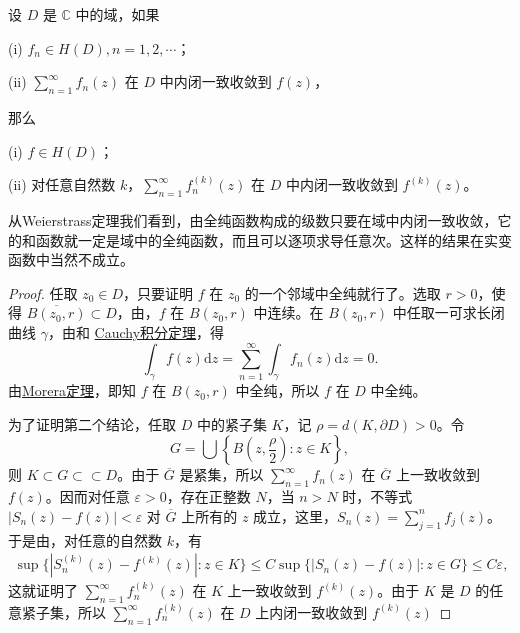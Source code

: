\documentclass[../../main.tex]{subfiles}
\begin{document}
\begin{theorem}[Weierstrass定理]\label{theorem:Weierstrass定理}
设 \( D \) 是 \( \mathbb{C} \) 中的域，如果

(i) \( f_n \in H(D), n = 1, 2, \cdots \)；

(ii) \( \sum_{n=1}^{\infty} f_n(z) \) 在 \( D \) 中内闭一致收敛到 \( f(z) \)，

那么

(i) \( f \in H(D) \)；

(ii) 对任意自然数 \( k \)，\( \sum_{n=1}^{\infty} f_n^{(k)}(z) \) 在 \( D \) 中内闭一致收敛到 \( f^{(k)}(z) \)。
\end{theorem}
\begin{note}
从Weierstrass定理我们看到，由全纯函数构成的级数只要在域中内闭一致收敛，它的和函数就一定是域中的全纯函数，而且可以逐项求导任意次。这样的结果在实变函数中当然不成立。
\end{note}
\begin{proof}
任取 \( z_0 \in D \)，只要证明 \( f \) 在 \( z_0 \) 的一个邻域中全纯就行了。选取 \( r > 0 \)，使得 \( \overline{B(z_0, r)} \subset D \)，由，\( f \) 在 \( B(z_0, r) \) 中连续。在 \( B(z_0, r) \) 中任取一可求长闭曲线 \( \gamma \)，由和 \hyperref[theorem:Cauchy-Goursat定理(Cauchy积分定理)]{Cauchy积分定理}，得
\[
\int_{\gamma} f(z) \mathrm{d}z = \sum_{n=1}^{\infty} \int_{\gamma} f_n(z) \mathrm{d}z = 0.
\]
由\hyperref[theorem:Morera定理]{Morera定理}，即知 \( f \) 在 \( B(z_0, r) \) 中全纯，所以 \( f \) 在 \( D \) 中全纯。

为了证明第二个结论，任取 \( D \) 中的紧子集 \( K \)，记 \( \rho = d(K, \partial D) > 0 \)。令
\[
G = \bigcup\left\{ B\left(z, \frac{\rho}{2}\right) : z \in K \right\},
\]
则 \( K \subset G \subset\subset D \)。由于 \( \overline{G} \) 是紧集，所以 \( \sum_{n=1}^{\infty} f_n(z) \) 在 \( \overline{G} \) 上一致收敛到 \( f(z) \)。因而对任意 \( \varepsilon > 0 \)，存在正整数 \( N \)，当 \( n > N \) 时，不等式 \( |S_n(z) - f(z)| < \varepsilon \) 对 \( \overline{G} \) 上所有的 \( z \) 成立，这里，\( S_n(z) = \sum_{j=1}^{n} f_j(z) \)。于是由，对任意的自然数 \( k \)，有
\begin{align*}
\sup\{|S_n^{(k)}(z) - f^{(k)}(z)| : z \in K\} \leqslant C\sup\{|S_n(z) - f(z)| : z \in G\} \leqslant C\varepsilon,
\end{align*}
这就证明了 \( \sum_{n=1}^{\infty} f_n^{(k)}(z) \) 在 \( K \) 上一致收敛到 \( f^{(k)}(z) \)。由于 \( K \) 是 \( D \) 的任意紧子集，所以 \( \sum_{n=1}^{\infty} f_n^{(k)}(z) \) 在 \( D \) 上内闭一致收敛到 \( f^{(k)}(z) \)
\end{proof}
\end{document}
